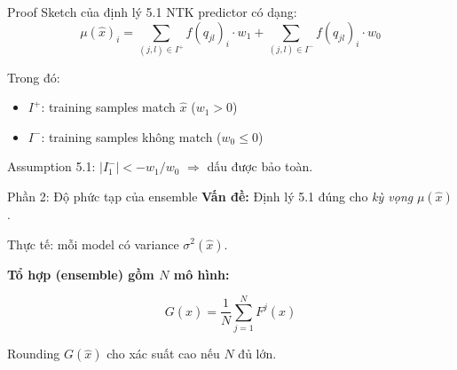 \begin{frame}{Proof Sketch của định lý 5.1}
  NTK predictor có dạng:
  \[
    \mu(\hat{x})_i = \sum_{(j,l) \in I^+} f(q_{jl})_i \cdot w_1 + \sum_{(j,l) \in I^-} f(q_{jl})_i \cdot w_0
  \]
  
  Trong đó:
  \begin{itemize}
    \item $I^+$: training samples match $\hat{x}$ ($w_1 > 0$)
    \item $I^-$: training samples không match ($w_0 \le 0$)
  \end{itemize}
  
  \vspace{0.2cm}
  Assumption 5.1: $|I^-_1| < -w_1/w_0$ $\Rightarrow$ dấu được bảo toàn.
\end{frame}

\begin{frame}{Phần 2: Độ phức tạp của ensemble}
  \textbf{Vấn đề:} Định lý 5.1 đúng cho \emph{kỳ vọng} $\mu(\hat{x})$.
  
  Thực tế: mỗi model có variance $\sigma^2(\hat{x})$.

  \vspace{0.3cm}
 \textbf{Tổ hợp (ensemble) gồm $N$ mô hình:}

  \[
    G(\hat{x}) = \frac{1}{N}\sum_{j=1}^N F^j(\hat{x})
  \]
  
  Rounding $G(\hat{x})$ cho xác suất cao nếu $N$ đủ lớn.
\end{frame}

